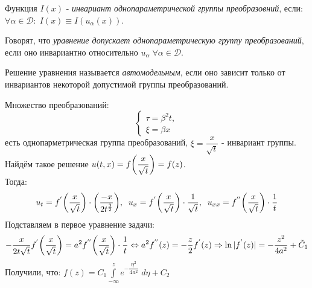 \begin{definition}
Функция $I(x)$ - \textit{инвариант однопараметрической группы преобразовний}, если: $\forall \alpha \in \mathcal{D}\colon\; I(x) \equiv I(u_{\alpha}(x))$.
\end{definition}
\begin{definition}
Говорят, что \textit{уравнение допускает однопараметрическую группу преобразований}, если оно инвариантно относительно $u_{\alpha}\; \forall \alpha \in \mathcal{D}$.
\end{definition}
\begin{definition}
Решение уравнения называется \textit{автомодельным}, если оно зависит только от инвариантов некоторой допустимой группы преобразований.
\end{definition}
Множество преобразований:
\begin{equation*}
\begin{cases}
	\tau = \beta^2 t, \\
	\xi = \beta x
\end{cases}
\end{equation*}
есть однопарметрическая группа преобразований, $\xi = \dfrac{x}{\sqrt{t}} $ - инвариант группы. \\
Найдём такое решение $u(t, x) = f\biggl(\dfrac{x}{\sqrt{t}}\biggr) = f(z)$. \\
Тогда:
\begin{equation*}
	u_t = f^{'}\biggl(\dfrac{x}{\sqrt{t}}\biggr) \cdot \biggl(\dfrac{-x}{2t^{\frac{3}{2}}}\biggr), \; \; u_x = f^{'}\biggl(\dfrac{x}{\sqrt{t}}\biggr) \cdot \dfrac{1}{\sqrt{t}},\; \; u_{xx} = f^{''}\biggl(\dfrac{x}{\sqrt{t}}\biggr) \cdot \dfrac{1}{t}
\end{equation*}
Подставляем в первое уравнение задачи:
\begin{equation*}
	-\dfrac{x}{2t\sqrt{t}} f^{'}\biggl(\dfrac{x}{\sqrt{t}}\biggr) = a^2 f^{''}\biggl(\dfrac{x}{\sqrt{t}}\biggr) \cdot \dfrac{1}{t} \Leftrightarrow a^2f^{''}(z) = -\dfrac{z}{2}f^{'}(z) \Rightarrow \ln|f^{'}(z)| = -\dfrac{z^2}{4a^2} + \tilde{C}_1
\end{equation*}
Получили, что: $f(z) = C_1 \displaystyle\int\limits_{-\infty}^z e^{-\dfrac{\eta^2}{4a^2}}\;d\eta + C_2$

